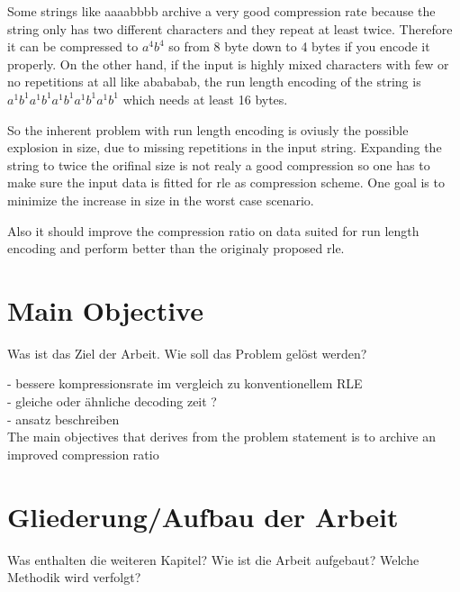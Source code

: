 Some strings like aaaabbbb archive a very good compression rate because the string only has two different characters and they repeat at least twice. Therefore it can be compressed to $a^4b^4$ so from 8 byte down to 4 bytes if you encode it properly. On the other hand, if the input is highly mixed characters with few or no repetitions at all like abababab, the run length encoding of the string is $a^1b^1a^1b^1a^1b^1a^1b^1a^1b^1$ which needs at least 16 bytes. \par
So the inherent problem with run length encoding is oviusly the possible explosion in size, due to missing repetitions in the input string. Expanding the string to twice the orifinal size is not realy a good compression so one has to make sure the input data is fitted for rle as compression scheme. One goal is to minimize the increase in size in the worst case scenario. \par
Also it should improve the compression ratio on data suited for run length encoding and perform better than the originaly proposed rle.

\section{Main Objective}
\label{ch:Introduction:sec:Main Objective}

Was ist das Ziel der Arbeit. Wie soll das Problem gelöst werden?

- bessere kompressionsrate im vergleich zu konventionellem RLE\\
- gleiche oder ähnliche decoding zeit ?\\
- ansatz beschreiben\\

The main objectives that derives from the problem statement is to archive an improved compression ratio

\section{Gliederung/Aufbau der Arbeit}
\label{ch:Intoduction:sec:Gliederung}

Was enthalten die weiteren Kapitel? Wie ist die Arbeit aufgebaut? Welche Methodik wird verfolgt?


